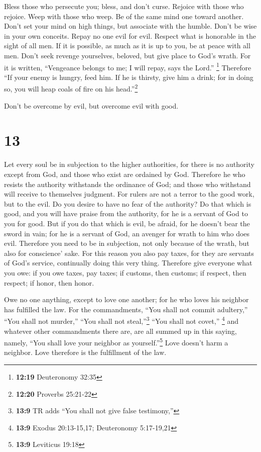  Bless those who persecute you; bless, and don't curse.
 Rejoice with those who rejoice. Weep with those who
weep.  Be of the same mind one toward another. Don't set
your mind on high things, but associate with the humble. Don't be wise
in your own conceits.  Repay no one evil for evil.
Respect what is honorable in the sight of all men.  If it
is possible, as much as it is up to you, be at peace with all men.
 Don't seek revenge yourselves, beloved, but give place
to God's wrath. For it is written, ``Vengeance belongs to me; I will
repay, says the Lord.'' \footnote{\textbf{12:19} Deuteronomy 32:35}
 Therefore ``If your enemy is hungry, feed him. If he is
thirsty, give him a drink; for in doing so, you will heap coals of fire
on his head.''\footnote{\textbf{12:20} Proverbs 25:21-22}

 Don't be overcome by evil, but overcome evil with good.

\hypertarget{section-12}{%
\section{13}\label{section-12}}

 Let every soul be in subjection to the higher
authorities, for there is no authority except from God, and those who
exist are ordained by God.  Therefore he who resists the
authority withstands the ordinance of God; and those who withstand will
receive to themselves judgment.  For rulers are not a
terror to the good work, but to the evil. Do you desire to have no fear
of the authority? Do that which is good, and you will have praise from
the authority,  for he is a servant of God to you for
good. But if you do that which is evil, be afraid, for he doesn't bear
the sword in vain; for he is a servant of God, an avenger for wrath to
him who does evil.  Therefore you need to be in
subjection, not only because of the wrath, but also for conscience'
sake.  For this reason you also pay taxes, for they are
servants of God's service, continually doing this very thing.
 Therefore give everyone what you owe: if you owe taxes,
pay taxes; if customs, then customs; if respect, then respect; if honor,
then honor.

 Owe no one anything, except to love one another; for he
who loves his neighbor has fulfilled the law.  For the
commandments, ``You shall not commit adultery,'' ``You shall not
murder,'' ``You shall not steal,''\footnote{\textbf{13:9} TR adds ``You
  shall not give false testimony,''} ``You shall not covet,''
\footnote{\textbf{13:9} Exodus 20:13-15,17; Deuteronomy 5:17-19,21} and
whatever other commandments there are, are all summed up in this saying,
namely, ``You shall love your neighbor as yourself.''\footnote{\textbf{13:9}
  Leviticus 19:18}  Love doesn't harm a neighbor. Love
therefore is the fulfillment of the law.

